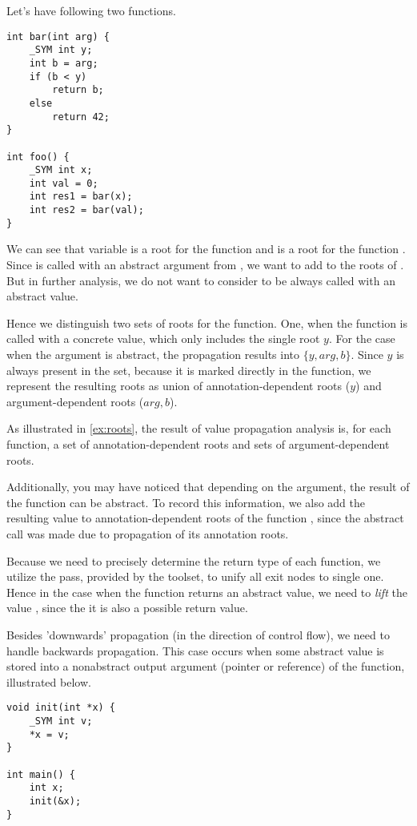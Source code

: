 \begin{example} \label{ex:roots} Let's have following two functions.
\begin{verbatim}
int bar(int arg) {
    _SYM int y;
    int b = arg;
    if (b < y)
        return b;
    else
        return 42;
}

int foo() {
    _SYM int x;
    int val = 0;
    int res1 = bar(x);
    int res2 = bar(val);
}
\end{verbatim}
    We can see that variable  is a root for the function  and
     is a root for the function . Since  is called
    with an abstract argument from , we want to add  to
    the roots of . But in further analysis, we do not want to consider
     to be always called with an abstract value.

    Hence we distinguish two sets of roots for the  function. One, when
    the function is called with a concrete value, which only includes the single root
    $y$. For the case when the argument is abstract, the propagation results
    into $\{y, arg, b\}$. Since $y$ is always present in the set, because it is
    marked directly in the function, we represent the resulting roots as union
    of annotation-dependent roots ($y$) and argument-dependent roots
    ($arg, b$).
\end{example}

As illustrated in \autoref{ex:roots}, the result of value propagation analysis
is, for each function, a set of annotation-dependent roots and sets of
argument-dependent roots.

Additionally, you may have noticed that depending on the
argument, the result of the function  can be abstract. To record this
information, we also add the resulting value  to annotation-dependent
roots of the function , since the abstract call was made due to
propagation of its annotation roots.

Because we need to precisely determine the return type of each function, we utilize
the  pass, provided by the \LLVM toolset, to unify all
exit nodes to single one. Hence in the case
when the function  returns an abstract value, we need to \emph{lift} the
value , since the it is also a possible return value.

Besides 'downwards' propagation (in the direction of control flow), we need
to handle backwards propagation. This case occurs when some abstract value is
stored into a nonabstract output argument (pointer or reference) of the function,
illustrated below.
\begin{verbatim}
void init(int *x) {
    _SYM int v;
    *x = v;
}

int main() {
    int x;
    init(&x);
}

\end{verbatim}

